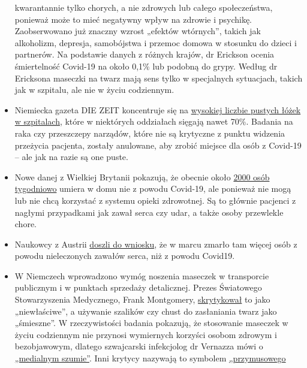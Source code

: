 \begin{itemize}
  kwarantannie tylko chorych, a nie zdrowych lub całego społeczeństwa,
  ponieważ może to mieć negatywny wpływ na zdrowie i psychikę.
  Zaobserwowano już znaczny wzrost „efektów wtórnych'', takich jak
  alkoholizm, depresja, samobójstwa i przemoc domowa w stosunku do
  dzieci i partnerów. Na podstawie danych z różnych krajów, dr Erickson
  ocenia śmiertelność Covid-19 na około 0,1\% lub podobną do grypy.
  Według dr Ericksona maseczki na twarz mają sens tylko w specjalnych
  sytuacjach, takich jak w szpitalu, ale nie w życiu codziennym.
\item
  Niemiecka gazeta DIE ZEIT koncentruje się na
  \href{https://www.zeit.de/2020/18/kliniken-coronavirus-intensivbetten-patienten-behandlung-notaufnahme}{wysokiej
  liczbie pustych łóżek w szpitalach}, które w niektórych oddziałach
  sięgają nawet 70\%. Badania na raka czy przeszczepy narządów, które
  nie są krytyczne z punktu widzenia przeżycia pacjenta, zostały
  anulowane, aby zrobić miejsce dla osób z Covid-19 -- ale jak na razie
  są one puste.
\item
  Nowe danej z Wielkiej Brytanii pokazują, że obecnie około
  \href{https://www.telegraph.co.uk/global-health/science-and-disease/two-new-waves-deaths-break-nhs-new-analysis-warns/}{2000
  osób tygodniowo} umiera w domu nie z powodu Covid-19, ale ponieważ nie
  mogą lub nie chcą korzystać z systemu opieki zdrowotnej. Są to głównie
  pacjenci z nagłymi przypadkami jak zawał serca czy udar, a także osoby
  przewlekle chore.
\item
  Naukowcy z Austrii
  \href{https://academic.oup.com/eurheartj/advance-article/doi/10.1093/eurheartj/ehaa314/5820829}{doszli
  do wniosku}, że w marcu zmarło tam więcej osób z powodu nieleczonych
  zawałów serca, niż z powodu Covid19.
\item
  W Niemczech wprowadzono wymóg noszenia maseczek w transporcie
  publicznym i w punktach sprzedaży detalicznej. Prezes Światowego
  Stowarzyszenia Medycznego, Frank Montgomery,
  \href{https://www.aerztezeitung.de/Politik/Montgomery-haelt-Maskenpflicht-fuer-falsch-408844.html}{skrytykował}
  to jako „niewłaściwe'', a używanie szalików czy chust do zasłaniania
  twarz jako „śmieszne''. W rzeczywistości badania pokazują, że
  stosowanie maseczek w życiu codziennym nie przynosi wymiernych
  korzyści osobom zdrowym i bezobjawowym, dlatego szwajcarski
  infekcjolog dr Vernazza mówi o
  \href{https://infekt.ch/2020/04/atemschutzmasken-fuer-alle-medienhype-oder-unverzichtbar/}{„medialnym
  szumie''}. Inni krytycy nazywają to symbolem
  \href{https://multipolar-magazin.de/artikel/maskenpflicht-gesellschaftliches-klima}{„przymusowego
}
\end{itemize}
